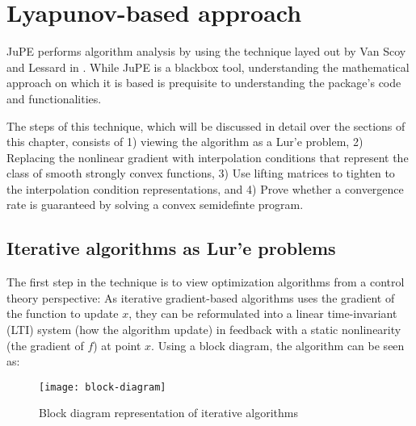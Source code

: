 \chapter{Lyapunov-based approach}

JuPE performs algorithm analysis by using the technique layed out by Van Scoy and Lessard in \cite{tutorial}. While JuPE is a blackbox tool, understanding the mathematical approach on which it is based is prequisite to understanding the package's code and functionalities.

The steps of this technique, which will be discussed in detail over the sections of this chapter, consists of 1) viewing the algorithm as a Lur'e problem, 2) Replacing the nonlinear gradient with interpolation conditions that represent the class of smooth strongly convex functions, 3) Use lifting matrices to tighten to the interpolation condition representations, and 4) Prove whether a convergence rate is guaranteed by solving a convex semidefinte program.
\section{Iterative algorithms as Lur'e problems}

The first step in the technique is to view optimization algorithms from a control theory perspective: As iterative gradient-based algorithms uses the gradient of the function to update \(x\), they can be reformulated into a linear time-invariant (LTI) system (how the algorithm update) in feedback with a static nonlinearity (the gradient of \(f\)) at point \(x\). Using a block diagram, the algorithm can be seen as:

\begin{figure}[h]
    \centering
	\texttt{[image: block-diagram]}
    \caption{Block diagram representation of iterative algorithms}
    \label{plot_result}
\end{figure}

